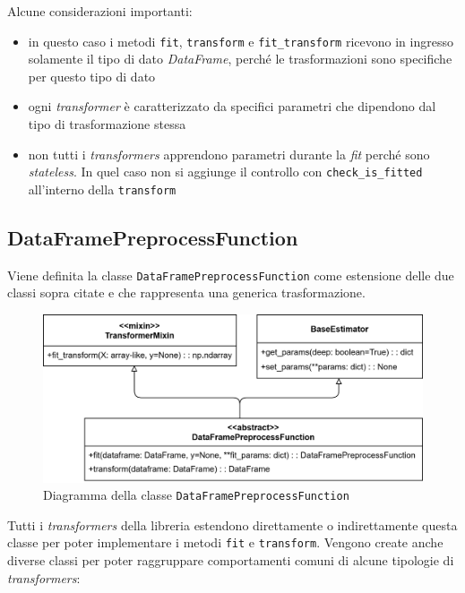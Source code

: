 Alcune considerazioni importanti:

\begin{itemize}
    \item in questo caso i metodi \texttt{fit}, \texttt{transform} e \texttt{fit\_transform} ricevono in ingresso solamente il tipo di dato \textit{DataFrame}, perché le trasformazioni sono specifiche per questo tipo di dato
    \item ogni \textit{transformer} è caratterizzato da specifici parametri che dipendono dal tipo di trasformazione stessa
    \item non tutti i \textit{transformers} apprendono parametri durante la \textit{fit} perché sono \textit{stateless}. In quel caso non si aggiunge il controllo con \texttt{check\_is\_fitted} all'interno della \texttt{transform}
\end{itemize}

\subsection{DataFramePreprocessFunction}

Viene definita la classe \texttt{DataFramePreprocessFunction} come estensione delle due classi sopra citate e che rappresenta una generica trasformazione.

\begin{figure}[htbp]
    \centering
    \includegraphics[scale=0.2]{figures/UML/preprocessing/dataframe_preprocess_function.png}
    \caption{Diagramma della classe \texttt{DataFramePreprocessFunction}}
\end{figure}

Tutti i \textit{transformers} della libreria estendono direttamente o indirettamente questa classe per poter implementare i metodi \texttt{fit} e \texttt{transform}. Vengono create anche diverse classi per poter raggruppare comportamenti comuni di alcune tipologie di \textit{transformers}:

